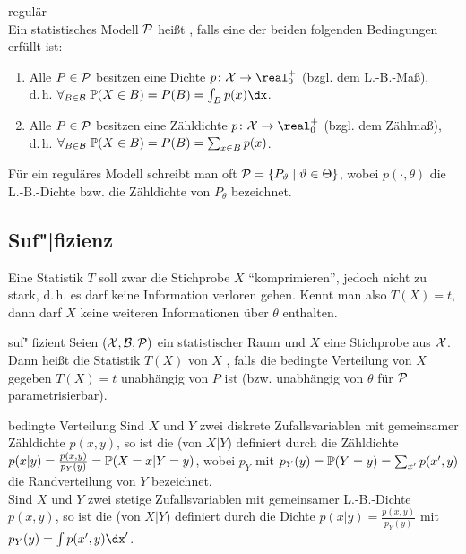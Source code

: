 \begin{Def}{regulär}\\
    Ein statistisches Modell $\P$ heißt , falls eine der beiden folgenden
    Bedingungen erfüllt ist:
    \begin{enumerate}
        \item
        Alle $P \in \P$ besitzen eine Dichte $p\colon \X \rightarrow \real_0^+$
        (bzgl. dem L.-B.-Maß),\\
        d.\,h. $\forall_{B \in \B}\; \PP(X \in B) = P(B) = \int_B p(x)\dx$.
        
        \item
        Alle $P \in \P$ besitzen eine Zähldichte $p\colon \X \rightarrow \real_0^+$
        (bzgl. dem Zählmaß),\\
        d.\,h. $\forall_{B \in \B}\; \PP(X \in B) = P(B) = \sum_{x \in B} p(x)$.
    \end{enumerate}
    Für ein reguläres Modell schreibt man oft $\P = \{P_\theta \;|\; \theta \in \Theta\}$,
    wobei $p(\cdot, \theta)$ die L.-B.-Dichte bzw. die Zähldichte von $P_\theta$ bezeichnet.
\end{Def}

\pagebreak

\subsection{%
    Suf"|fizienz%
}

\begin{Bem}
    Eine Statistik $T$ soll zwar die Stichprobe $X$ "`komprimieren"', jedoch nicht zu stark,
    d.\,h. es darf keine Information verloren gehen.
    Kennt man also $T(X) = t$, dann darf $X$ keine weiteren Informationen über $\theta$ enthalten.
\end{Bem}

\begin{Def}{suf"|fizient}
    Seien $(\X, \B, \P)$ ein statistischer Raum und $X$ eine Stichprobe aus $\X$.\\
    Dann heißt die Statistik $T(X)$ von $X$ , falls
    die bedingte Verteilung von $X$ gegeben $T(X) = t$ unabhängig von $P$ ist
    (bzw. unabhängig von $\theta$ für $\P$ parametrisierbar).
\end{Def}

\begin{Def}{bedingte Verteilung}
    Sind $X$ und $Y$ zwei diskrete Zufallsvariablen mit gemeinsamer Zähldichte $p(x, y)$,
    so ist die  (von $X|Y$) definiert durch
    die Zähldichte $p(x|y) = \frac{p(x, y)}{p_Y(y)} = \PP(X = x|Y = y)$,
    wobei $p_Y$ mit $p_Y(y) = \PP(Y = y) = \sum_{x'} p(x', y)$ die Randverteilung von $Y$
    bezeichnet.\\
    Sind $X$ und $Y$ zwei stetige Zufallsvariablen mit gemeinsamer L.-B.-Dichte $p(x, y)$,
    so ist die  (von $X|Y$) definiert durch 
    die Dichte $p(x|y) = \frac{p(x, y)}{p_Y(y)}$ mit $p_Y(y) = \int p(x', y)\dx'$.
\end{Def}

